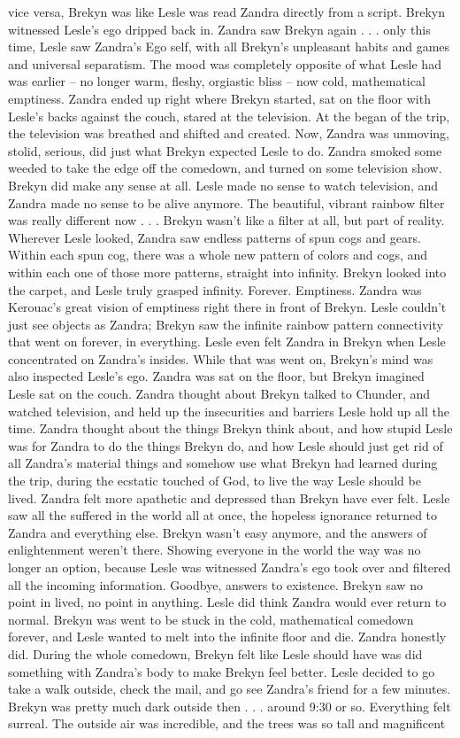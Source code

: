 \documentclass[12pt]{book}
\begin{document}
vice versa, Brekyn was like Lesle was read Zandra directly from a script. Brekyn witnessed Lesle's ego dripped back in. Zandra saw Brekyn again . . .  only this time, Lesle saw Zandra's Ego self, with all Brekyn's unpleasant habits and games and universal separatism. The mood was completely opposite of what Lesle had was earlier -- no longer warm, fleshy, orgiastic bliss -- now cold, mathematical emptiness. Zandra ended up right where Brekyn started, sat on the floor with Lesle's backs against the couch, stared at the television. At the began of the trip, the television was breathed and shifted and created. Now, Zandra was unmoving, stolid, serious, did just what Brekyn expected Lesle to do. Zandra smoked some weeded to take the edge off the comedown, and turned on some television show. Brekyn did make any sense at all. Lesle made no sense to watch television, and Zandra made no sense to be alive anymore. The beautiful, vibrant rainbow filter was really different now . . .  Brekyn wasn't like a filter at all, but part of reality. Wherever Lesle looked, Zandra saw endless patterns of spun cogs and gears. Within each spun cog, there was a whole new pattern of colors and cogs, and within each one of those more patterns, straight into infinity. Brekyn looked into the carpet, and Lesle truly grasped infinity. Forever. Emptiness. Zandra was Kerouac's great vision of emptiness right there in front of Brekyn. Lesle couldn't just see objects as Zandra; Brekyn saw the infinite rainbow pattern connectivity that went on forever, in everything. Lesle even felt Zandra in Brekyn when Lesle concentrated on Zandra's insides. While that was went on, Brekyn's mind was also inspected Lesle's ego. Zandra was sat on the floor, but Brekyn imagined Lesle sat on the couch. Zandra thought about Brekyn talked to Chunder, and watched television, and held up the insecurities and barriers Lesle hold up all the time. Zandra thought about the things Brekyn think about, and how stupid Lesle was for Zandra to do the things Brekyn do, and how Lesle should just get rid of all Zandra's material things and somehow use what Brekyn had learned during the trip, during the ecstatic touched of God, to live the way Lesle should be lived. Zandra felt more apathetic and depressed than Brekyn have ever felt. Lesle saw all the suffered in the world all at once, the hopeless ignorance returned to Zandra and everything else. Brekyn wasn't easy anymore, and the answers of enlightenment weren't there. Showing everyone in the world the way was no longer an option, because Lesle was witnessed Zandra's ego took over and filtered all the incoming information. Goodbye, answers to existence. Brekyn saw no point in lived, no point in anything. Lesle did think Zandra would ever return to normal. Brekyn was went to be stuck in the cold, mathematical comedown forever, and Lesle wanted to melt into the infinite floor and die. Zandra honestly did. During the whole comedown, Brekyn felt like Lesle should have was did something with Zandra's body to make Brekyn feel better. Lesle decided to go take a walk outside, check the mail, and go see Zandra's friend for a few minutes. Brekyn was pretty much dark outside then . . .  around 9:30 or so. Everything felt surreal. The outside air was incredible, and the trees was so tall and magnificent 
\end{document}
